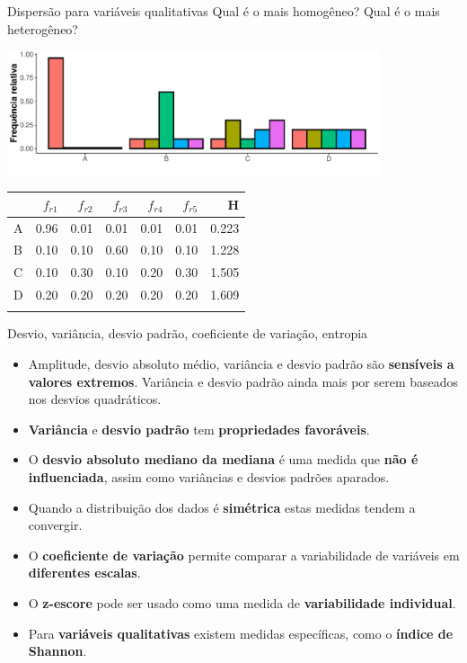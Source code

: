 \documentclass[
  ignorenonframetext,
  serif,
  professionalfont,
  usenames,
  dvipsnames,
  aspectratio = 169]{beamer}
\begin{document}
\begin{frame}{Dispersão para variáveis qualitativas}
\label{dispersuxe3o-para-variuxe1veis-qualitativas-2}
Qual é o mais homogêneo? Qual é o mais heterogêneo?

\begin{center}\includegraphics[width=11cm]{encontro2_files/figure-beamer/unnamed-chunk-19-1} \end{center}

\begin{longtable}[]{@{}lrrrrrr@{}}
\toprule\noalign{}
& \(f_{r1}\) & \(f_{r2}\) & \(f_{r3}\) & \(f_{r4}\) & \(f_{r5}\) & H \\
\midrule\noalign{}
\endhead
A & 0.96 & 0.01 & 0.01 & 0.01 & 0.01 & 0.223 \\
B & 0.10 & 0.10 & 0.60 & 0.10 & 0.10 & 1.228 \\
C & 0.10 & 0.30 & 0.10 & 0.20 & 0.30 & 1.505 \\
D & 0.20 & 0.20 & 0.20 & 0.20 & 0.20 & 1.609 \\
\bottomrule\noalign{}
\end{longtable}
\end{frame}

\begin{frame}{Desvio, variância, desvio padrão, coeficiente de variação,
entropia}
\label{desvio-variuxe2ncia-desvio-padruxe3o-coeficiente-de-variauxe7uxe3o-entropia}
\begin{itemize}
\item
  Amplitude, desvio absoluto médio, variância e desvio padrão são
  \textbf{sensíveis a valores extremos}. Variância e desvio padrão ainda
  mais por serem baseados nos desvios quadráticos.
\item
  \textbf{Variância} e \textbf{desvio padrão} tem
  \textbf{propriedades favoráveis}.
\item
  O \textbf{desvio absoluto mediano da mediana} é uma medida que
  \textbf{não é influenciada}, assim como variâncias e desvios padrões
  aparados.
\item
  Quando a distribuição dos dados é \textbf{simétrica} estas medidas
  tendem a convergir.
\item
  O \textbf{coeficiente de variação} permite comparar a variabilidade de
  variáveis em \textbf{diferentes escalas}.
\item
  O \textbf{z-escore} pode ser usado como uma medida de
  \textbf{variabilidade individual}.
\item
  Para \textbf{variáveis qualitativas} existem medidas específicas, como
  o \textbf{índice de Shannon}.
\end{itemize}
\end{frame}
\end{document}
